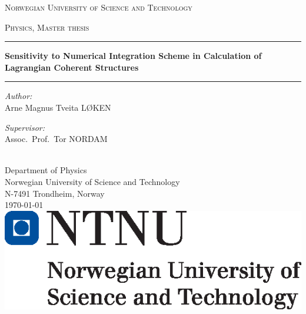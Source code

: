 \begingroup
{}
\begin{titlingpage}
    \begin{center}
        \vspace*{.04\textheight}
        {\scshape \fontsize{17pt}{17pt}\selectfont Norwegian University of Science and Technology\par}%
        \vspace{0.75cm}\textsc{\large Physics, Master thesis}\vspace{0.4cm}

        \hrule\phantom{}\vspace{0.4cm}
        {\LARGE \bfseries Sensitivity to Numerical Integration Scheme in Calculation
        of Lagrangian Coherent Structures\par}\vspace{0.8cm}
        \hrule\phantom{}\vspace{1cm}

        \begin{minipage}[t]{0.45\textwidth}
            \begin{flushleft}\large
                \emph{Author:}\\
                Arne Magnus Tveita LØKEN
            \end{flushleft}
        \end{minipage}
        \begin{minipage}[t]{0.45\textwidth}
            \begin{flushright}\large
                \emph{Supervisor:}\\
                Assoc.\ Prof.\ Tor NORDAM
            \end{flushright}
        \end{minipage}\\[2cm]


        \large {Department of Physics\\%
            Norwegian University of Science and Technology\\%
        N-7491 Trondheim, Norway}\\[1.5cm]
        {\large \today}\\[0.5cm]
        \includegraphics{titlepage/hovedlogo_eng.eps}
    \end{center}
\end{titlingpage}
\endgroup
\cleartorecto
